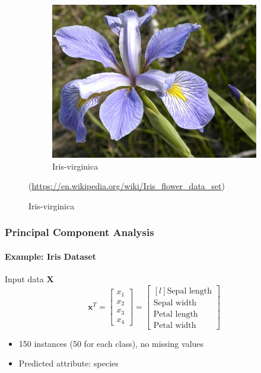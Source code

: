 \documentclass[12pt,a4paper,xcolor=dvipsnames,xcolor=table]{beamer}
\begin{document}
\begin{frame}
\begin{figure}
\begin{subfigure}{0.3\textwidth}
        \end{subfigure}
        \begin{subfigure}{0.3\textwidth}
            \includegraphics[width=\textwidth]{fig/iris_virginica.jpg}\caption{Iris-virginica}
        \end{subfigure} 
        {\color{gray} ({\small \url{https://en.wikipedia.org/wiki/Iris\_flower\_data\_set}})}
    \end{figure}
\end{frame}

\begin{frame}
\frametitle{Principal Component Analysis}
\framesubtitle{Example: Iris Dataset}

Input data $\mathbf{X}$
\[
    \mathbf{x}^T = \begin{bmatrix}
        x_1\\ x_2\\ x_3 \\x_4
    \end{bmatrix} = \begin{bmatrix*}[l]
        \text{Sepal length}\\ \text{Sepal width}\\ \text{Petal length}\\ \text{Petal width}
    \end{bmatrix*}
\]
\begin{itemize}
    \item 150 instances (50 for each class), no missing values
    \item Predicted attribute: species
\end{itemize}
\end{frame}
\end{document}
